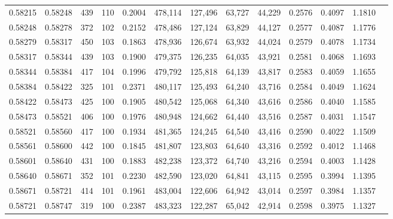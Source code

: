 \begin{tabular}{rrrrrrrrrrrrr}
0.58215 & 0.58248 &   439 & 110 &                                     0.2004 & 478,114 & 127,496 &  63,727 &  44,229 & 0.2576 & 0.4097 & 1.1810 \\
0.58248 & 0.58278 &   372 & 102 &                                     0.2152 & 478,486 & 127,124 &  63,829 &  44,127 & 0.2577 & 0.4087 & 1.1776 \\
0.58279 & 0.58317 &   450 & 103 &                                     0.1863 & 478,936 & 126,674 &  63,932 &  44,024 & 0.2579 & 0.4078 & 1.1734 \\
0.58317 & 0.58344 &   439 & 103 &                                     0.1900 & 479,375 & 126,235 &  64,035 &  43,921 & 0.2581 & 0.4068 & 1.1693 \\
0.58344 & 0.58384 &   417 & 104 &                                     0.1996 & 479,792 & 125,818 &  64,139 &  43,817 & 0.2583 & 0.4059 & 1.1655 \\
0.58384 & 0.58422 &   325 & 101 &                                     0.2371 & 480,117 & 125,493 &  64,240 &  43,716 & 0.2584 & 0.4049 & 1.1624 \\
0.58422 & 0.58473 &   425 & 100 &                                     0.1905 & 480,542 & 125,068 &  64,340 &  43,616 & 0.2586 & 0.4040 & 1.1585 \\
0.58473 & 0.58521 &   406 & 100 &                                     0.1976 & 480,948 & 124,662 &  64,440 &  43,516 & 0.2587 & 0.4031 & 1.1547 \\
0.58521 & 0.58560 &   417 & 100 &                                     0.1934 & 481,365 & 124,245 &  64,540 &  43,416 & 0.2590 & 0.4022 & 1.1509 \\
0.58561 & 0.58600 &   442 & 100 &                                     0.1845 & 481,807 & 123,803 &  64,640 &  43,316 & 0.2592 & 0.4012 & 1.1468 \\
0.58601 & 0.58640 &   431 & 100 &                                     0.1883 & 482,238 & 123,372 &  64,740 &  43,216 & 0.2594 & 0.4003 & 1.1428 \\
0.58640 & 0.58671 &   352 & 101 &                                     0.2230 & 482,590 & 123,020 &  64,841 &  43,115 & 0.2595 & 0.3994 & 1.1395 \\
0.58671 & 0.58721 &   414 & 101 &                                     0.1961 & 483,004 & 122,606 &  64,942 &  43,014 & 0.2597 & 0.3984 & 1.1357 \\
0.58721 & 0.58747 &   319 & 100 &                                     0.2387 & 483,323 & 122,287 &  65,042 &  42,914 & 0.2598 & 0.3975 & 1.1327 \\

\end{tabular}
